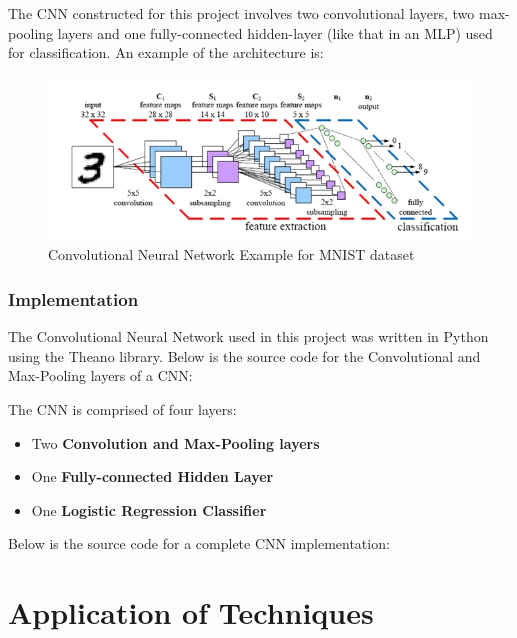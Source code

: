 \documentclass[12pt, titlepage]{article}
\begin{document}
  The CNN constructed for this project involves two convolutional layers, two max-pooling layers and one fully-connected
  hidden-layer (like that in an MLP) used for classification. An example of the architecture is: \\
  \FloatBarrier
  \begin{figure}[h]
    \caption{Convolutional Neural Network Example for MNIST dataset}
    \centering
    \includegraphics[scale=0.65]{images/architecture_cnn_example}
  \end{figure}
  \FloatBarrier
  
  \subsubsection{Implementation}
  
  The Convolutional Neural Network used in this project was written in Python using the Theano library. Below is the source
  code for the Convolutional and Max-Pooling layers of a CNN:
  
  \vspace{3mm}
  The CNN is comprised of four layers:
  \begin{itemize}
    \item Two \textbf{Convolution and Max-Pooling layers}
    \item One \textbf{Fully-connected Hidden Layer}
    \item One \textbf{Logistic Regression Classifier}
  \end{itemize}
  Below is the source code for a complete CNN implementation:
  
  
\newpage
\section{Application of Techniques}
\end{document}
